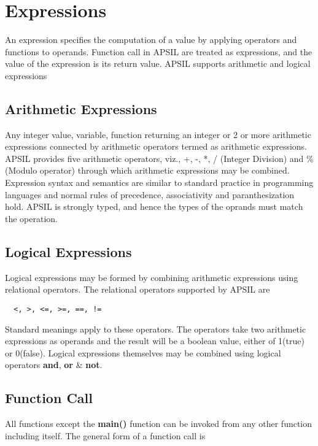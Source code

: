 \documentclass[11pt]{article}
\begin{document}
\section{Expressions}
An expression specifies the computation of a value by applying operators and functions to operands. Function call in APSIL are treated as expressions, and the value of the expression is its return value. APSIL supports arithmetic and logical expressions

\subsection{Arithmetic Expressions}

Any integer value, variable, function returning an integer or 2 or more arithmetic expressions connected by arithmetic operators termed as arithmetic expressions. APSIL provides five arithmetic operators, viz., +, -, *, / (Integer Division) and \% (Modulo operator) through which arithmetic expressions may be combined. Expression syntax and semantics are similar to standard practice in programming languages and normal rules of precedence, associativity and paranthesization hold. APSIL is strongly typed, and hence the types of the oprands must match the operation. 


\subsection{Logical Expressions}

Logical expressions may be formed by combining arithmetic expressions using relational operators. The relational operators supported by APSIL are \begin{verbatim}  <, >, <=, >=, ==, !=
\end{verbatim}
Standard  meanings apply to these operators. The operators take two arithmetic expressions as operands and the result will be a boolean value, either of 1(true) or 0(false).  Logical expressions themselves may be combined using logical operators \textbf{and}, \textbf{or} \&  \textbf{not}.

\subsection{Function Call}

All functions except the \textbf{main()} function can be invoked from any other function including itself. The general form of a function call is \\
\end{document}

